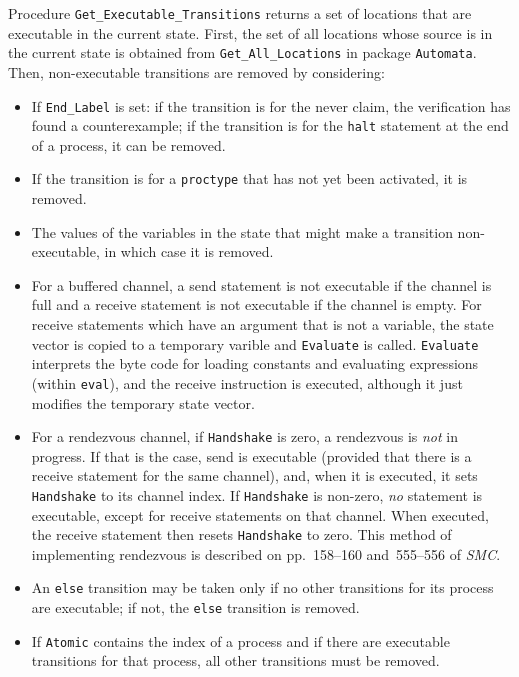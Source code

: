 \documentclass[11pt]{article}
\newcommand*{\smc}{\textit{SMC}}
\newcommand*{\p}[1]{\texttt{#1}}
\begin{document}
Procedure \p{Get\_Executable\_Transitions} returns a set of locations
that are executable in the current state. First, the set of all
locations whose source is in the current state is obtained from
\p{Get\_All\_Locations} in package \p{Automata}. Then, non-executable
transitions are removed by considering:

\begin{itemize}

\item If \p{End\_Label} is set: if the transition is for the never
claim, the verification has found a counterexample; if the transition is
for the \p{halt} statement at the end of a process, it can be removed.

\item If the transition is for a \p{proctype} that has not yet been
activated, it is removed.

\item The values of the variables in the state that might make a
transition non-executable, in which case it is removed.

\item For a buffered channel, a send statement is not executable if the
channel is full and a receive statement is not executable if the channel
is empty. For receive statements which have an argument that is not a
variable, the state vector is copied to a temporary varible and
\p{Evaluate} is called. \p{Evaluate} interprets the byte code for
loading constants and evaluating expressions (within \p{eval}), and the
receive instruction is executed, although it just modifies the temporary
state vector.

\item For a rendezvous channel, if \p{Handshake} is zero, a rendezvous
is \emph{not} in progress. If that is the case, send is executable
(provided that there is a receive statement for the same channel), and,
when it is executed, it sets \p{Handshake} to its channel index. If
\p{Handshake} is non-zero, \emph{no} statement is executable, except for
receive statements on that channel. When executed, the receive statement
then resets \p{Handshake} to zero. This method of implementing rendezvous
is described on pp.~158--160 and~555--556 of \smc{}.

\item An \p{else} transition may be taken only if no other transitions
for its process are executable; if not, the \p{else} transition is
removed.

\item If \p{Atomic} contains the index of a process and if there are
executable transitions for that process, all other transitions must be
removed.
\end{itemize}
\end{document}
